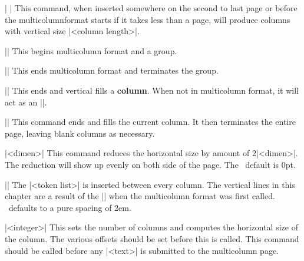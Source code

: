 \beginblockmode
\ext\@| |
\nbr
This command, when inserted somewhere  on the second to last page or before
the 
multicolumnformat starts if it takes less than a page, will produce columns
with vertical size |<column length>|.


\mbr
\ext\@|\beginmulticolumnformat|
\nbr
This begins multicolumn format and a group.


\mbr
\ext\@|\endmulticolumnformat|
\nbr
This ends multicolumn format and terminates the group. 

\mbr
\ext\@|\ejectcolumn|
\nbr
This ends and vertical fills a {\bf column}. When not in multicolumn format,
it will act as an |\ejectpage|.


\mbr
\ext\@|\ejectpage|
\nbr
This command ends and fills the current column. It  then terminates the
entire page, leaving blank columns as necessary.

\mbr
\ext\@|\firstcolumnoffset 
      [=] <dimen>|
\nbr
This command reduces the horizontal size by
amount of 2|<dimen>|. The reduction will show up 
evenly on both side of the page. The \intex\ default is 0pt.

\mbr
\ext\@||
\nbr
The |<token list>| is  inserted between every
column. The vertical lines  in this chapter are a result of the
|\vrule| when the multicolumn format was first called. \intex\ defaults to a
pure spacing of 2em. 


\mbr
\ext\@|\numberofcolumns 
      [=] <integer>|
\nbr
This sets the number of columns and computes the horizontal size of the
column. The various offsets should be set before this is called. This command
should be called before any |<text>| is submitted to the multicolumn page.
\endblockmode
\endmulticolumnformat
\ejectpage
\done